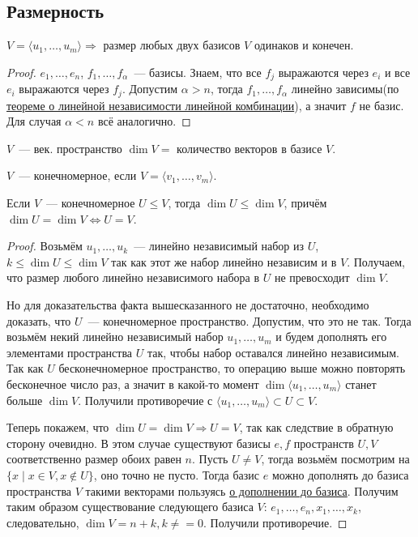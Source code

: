 \subsection{Размерность}
\begin{theorem}
    $V = \langle u_1,\dots,u_m\rangle \Rightarrow$ размер любых двух базисов $V$ одинаков и конечен.
\end{theorem}
\begin{proof}
    $e_1,\dots,e_n$, $f_1,\dots,f_\alpha$~--- базисы. Знаем, что все $f_j$
    выражаются через $e_i$ и все $e_i$ выражаются через $f_j$.
    Допустим $\alpha > n$, тогда $f_1,\dots,f_\alpha$ линейно зависимы(по \hyperref[thm:О линейной независимости линейной комбинации]
    {теореме о линейной независимости линейной комбинации}), а значит $f$ не базис.
    Для случая $\alpha < n$ всё аналогично.
\end{proof}
\begin{definition}
    $V$~--- век. пространство $\dim V =$ количество векторов в базисе $V$.
\end{definition}
\begin{definition}
    $V$~--- конечномерное, если $V = \langle v_1,\dots, v_m\rangle$.
\end{definition}
\begin{lemma}
    Если $V$~--- конечномерное $U \leq V$, тогда $\dim U \leq \dim V$, причём $\dim U = \dim V \Leftrightarrow U=V$.
\end{lemma}
\begin{proof}
    Возьмём $u_1,\dots,u_k$~--- линейно независимый набор из $U$, $k \leq \dim U \leq \dim V$ так как этот же набор линейно независим и в $V$. 
    Получаем, что размер любого линейно независимого набора в $U$ не превосходит $\dim V$.

    Но для доказательства факта вышесказанного не достаточно, необходимо доказать,
    что $U$~--- конечномерное пространство. Допустим, что это не так.
    Тогда возьмём некий линейно независимый набор $u_1,\dots, u_m$ и будем дополнять его элементами пространства $U$ так, чтобы набор оставался линейно независимым.
    Так как $U$ бесконечномерное пространство, то операцию выше можно повторять бесконечное число раз,
    а значит в какой-то момент $\dim\langle u_1, \dots, u_m\rangle$ станет больше $\dim V$. 
    Получили противоречие с $\langle u_1, \dots, u_m\rangle \subset U \subset V$.

    Теперь покажем, что $\dim U = \dim V \Rightarrow U = V$,
    так как следствие в обратную сторону очевидно. В этом случае существуют базисы
    $e, f$ пространств $U, V$ соответственно размер обоих равен $n$. Пусть $U \neq V$,
    тогда возьмём посмотрим на $\{x \mid x \in V, x \not\in U\}$, оно точно не пусто.
    Тогда базис $e$ можно дополнять до базиса пространства $V$ такими векторами пользуясь
    \hyperref[thm:О дополнении до базиса]{о дополнении до базиса}. Получим таким образом
    существование следующего базиса $V$: $e_1,\dots,e_n,x_1,\dots,x_k$, следовательно,
    $\dim V = n + k, k \neq = 0$. Получили противоречие.
\end{proof}
